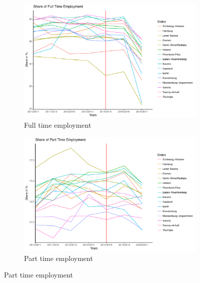 \documentclass[a4paper]{article}
\begin{document}
%
% 
\begin{figure}
\caption{Share of employment for each state over time}
\begin{subfigure}[h]{0.5\linewidth}
\includegraphics[width=\textwidth]{q4/growthfull.pdf}
\caption{Full time employment}
\end{subfigure}
\hfill
\begin{subfigure}[h]{0.5\linewidth}
\includegraphics[width=\textwidth]{q4/growthpart.pdf}
\caption{Part time employment}
\end{subfigure}


\end{figure}
\end{document}
